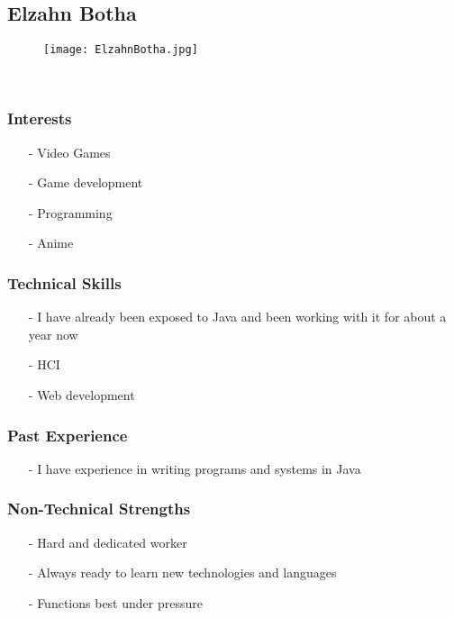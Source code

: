 
\subsection{Elzahn Botha}
\begin{wrapfigure}[6]{l}{90px}

\texttt{[image: ElzahnBotha.jpg]}
\end{wrapfigure}

\textcolor{white}{.}
\subsubsection{Interests}
\begin{itemize}
	\item[-]{Video Games}
	\item[-]{Game development}
	\item[-]{Programming}
	\item[-]{Anime}
\end{itemize}
\subsubsection{Technical Skills} 
\begin{itemize}
	\item[-]{I have already been exposed to Java and been working with it for about a year now}
	\item[-]{HCI}
	\item[-]{Web development}
\end{itemize}
\subsubsection{Past Experience}
\begin{itemize}
	\item[-]{I have experience in writing programs and systems in Java}
\end{itemize}
\subsubsection{Non-Technical Strengths} 
\begin{itemize}
	\item[-]{Hard and dedicated worker}
	\item[-]{Always ready to learn new technologies and languages}
	\item[-]{Functions best under pressure}
\end{itemize}
